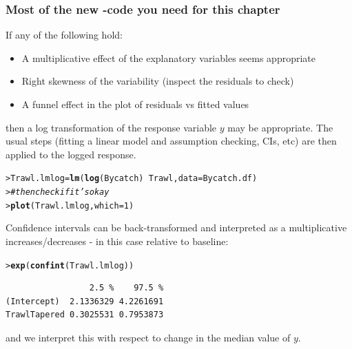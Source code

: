 \documentclass{beamer}\usepackage[]{graphicx}\usepackage[]{xcolor}
\makeatletter
\newcommand{\hlnum}[1]{\textcolor[rgb]{0.686,0.059,0.569}{#1}}%
\newcommand{\hlcom}[1]{\textcolor[rgb]{0.678,0.584,0.686}{\textit{#1}}}%
\newcommand{\hlopt}[1]{\textcolor[rgb]{0,0,0}{#1}}%
\newcommand{\hlstd}[1]{\textcolor[rgb]{0.345,0.345,0.345}{#1}}%
\newcommand{\hlkwb}[1]{\textcolor[rgb]{0.69,0.353,0.396}{#1}}%
\newcommand{\hlkwc}[1]{\textcolor[rgb]{0.333,0.667,0.333}{#1}}%
\newcommand{\hlkwd}[1]{\textcolor[rgb]{0.737,0.353,0.396}{\textbf{#1}}}%
\newenvironment{kframe}{%
 \def\at@end@of@kframe{}%
 \ifinner\ifhmode%
  \def\at@end@of@kframe{\end{minipage}}%
  \begin{minipage}{\columnwidth}%
 \fi\fi%
 \def\FrameCommand##1{\hskip\@totalleftmargin \hskip-\fboxsep
 \colorbox{shadecolor}{##1}\hskip-\fboxsep
     \hskip-\linewidth \hskip-\@totalleftmargin \hskip\columnwidth}%
 \MakeFramed {\advance\hsize-\width
   \@totalleftmargin\z@ \linewidth\hsize
   \@setminipage}}%
 {\par\unskip\endMakeFramed%
 \at@end@of@kframe}
\newenvironment{knitrout}{}{} %
\makeatother
\begin{document}
\begin{frame}[fragile]

\frametitle{Most of the new -code you need for this chapter}
If any of the following hold:
\begin{itemize}
\item A multiplicative effect of the explanatory variables seems appropriate
\item Right skewness of the variability (inspect the residuals to check)
\item A funnel effect in the plot of residuals vs fitted values
\end{itemize}
then a log transformation of the response variable $y$ may be appropriate. The usual steps (fitting a linear model and assumption checking, CIs, etc) are then applied to the logged response.


\begin{knitrout}\scriptsize
{}\color{fgcolor}\begin{kframe}
\begin{alltt}
\hlstd{> }\hlstd{Trawl.lmlog}\hlkwb{=}\hlkwd{lm}\hlstd{(}\hlkwd{log}\hlstd{(Bycatch)}\hlopt{~}\hlstd{Trawl,}\hlkwc{data}\hlstd{=Bycatch.df)}
\hlstd{> }\hlcom{# then check if it's okay}
\hlstd{> }\hlkwd{plot}\hlstd{(Trawl.lmlog,}\hlkwc{which}\hlstd{=}\hlnum{1}\hlstd{)}
\end{alltt}
\end{kframe}
\end{knitrout}


Confidence intervals can be back-transformed and interpreted as a multiplicative increases/decreases - in this case relative to baseline:


\begin{knitrout}\scriptsize
{}\color{fgcolor}\begin{kframe}
\begin{alltt}
\hlstd{> }\hlkwd{exp}\hlstd{(}\hlkwd{confint}\hlstd{(Trawl.lmlog))}
\end{alltt}
\begin{verbatim}
                 2.5 %    97.5 %
(Intercept)  2.1336329 4.2261691
TrawlTapered 0.3025531 0.7953873
\end{verbatim}
\end{kframe}
\end{knitrout}

and we interpret this with respect to change in the median value of $y$.

\end{frame}
\end{document}
